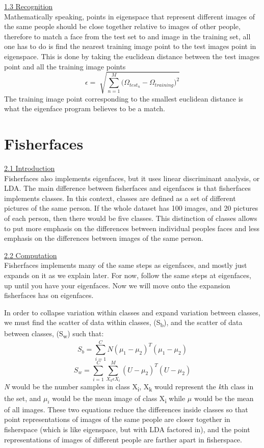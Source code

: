 \documentclass{tufte-handout}
\begin{document}
\vspace{5mm} \noindent \underline{1.3 Recognition}\\
Mathematically speaking, points in eigenspace that represent different images of the same people should be close together relative to images of other people, therefore to match a face from the test set to and image in the training set, all one has to do is find the nearest training image point to the test image\textsc{}s point in eigenspace. This is done by taking the euclidean distance between the test image\textsc{}s point and all the training image points
\[\epsilon = \sqrt[]{\sum_{n=1}^{M} \big(\Omega_{test_n} - \Omega_{training} \big) ^2}\]
The training image point corresponding to the smallest euclidean distance is what the eigenface program believes to be a match.



\section{Fisherfaces}
\underline{2.1 Introduction} \\
Fisherfaces also implements eigenfaces, but it uses linear discriminant analysis, or LDA. The main difference between fisherfaces and eigenfaces is that fisherfaces implements classes. In this context, classes are defined as a set of different pictures of the same person. If the whole dataset has 100 images, and 20 pictures of each person, then there would be five classes. This distinction of classes allows to put more emphasis on the differences between individual people\textsc{}s faces and less emphasis on the differences between images of the same person.


\vspace{5mm} \noindent \underline{2.2 Computation}\\
Fisherfaces implements many of the same steps as eigenfaces, and mostly just expands on it as we explain later. For now, follow the same steps at eigenfaces, up until you have your eigenfaces. Now we will move onto the expansion fisherfaces has on eigenfaces.

In order to collapse variation within classes and expand variation between classes, we must find the scatter of data within classes, (S\textsubscript{b}), and the scatter of data between classes, (S\textsubscript{w}) such that: 
\[S_b = \sum\limits_{i=1}^CN(\mu_1-\mu_2)^T (\mu_1-\mu_2)\]
\[S_w = \sum\limits_{i=1}^C\sum\limits_{X_k\epsilon X_i}^M(U-\mu_2)^T (U-\mu_2)\]
\textit{N} would be the number samples in class X\textsubscript{i}, X\textsubscript{k} would represent the \textit{k}th class in the set, and $\mu_i$ would be the mean image of class X\textsubscript{i} while $\mu$ would be the mean of all images. These two equations reduce the differences inside classes so that point representations of images of the same people are closer together in fisherspace (which is like eigenspace, but with LDA factored in), and the point representations of images of different people are farther apart in fisherspace.
\end{document}
